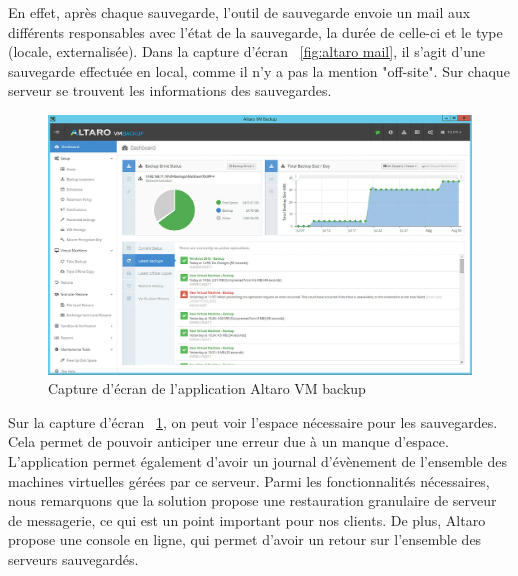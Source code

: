 \documentclass[pfe]{tnreport} %
\begin{document}
En effet, après chaque sauvegarde, l'outil de sauvegarde envoie un mail aux différents responsables avec l'état de la sauvegarde, la durée de celle-ci et le type (locale, externalisée). \newline
Dans la capture d'écran ~\ref{fig:altaro mail}, il s'agit d'une sauvegarde effectuée en local, comme il n'y a pas la mention "off-site". \newline
Sur chaque serveur se trouvent les informations des sauvegardes.
\begin{figure}[ht]
 \centering
 \includegraphics[width=15cm]{figures/Altaro-VM-Backup-dashboard.jpg}
 \caption{Capture d'écran de l'application Altaro VM backup}
 \label{fig:altaro console1}
\end{figure}

Sur la capture d'écran ~\ref{fig:altaro console1}, on peut voir l'espace nécessaire pour les sauvegardes. Cela permet de pouvoir anticiper une erreur due à un manque d'espace. L'application permet également d'avoir un journal d'évènement de l'ensemble des machines virtuelles gérées par ce serveur. \newline
Parmi les fonctionnalités nécessaires, nous remarquons que la solution propose une restauration granulaire de serveur de messagerie, ce qui est un point important pour nos clients. \newline
De plus, Altaro propose une console en ligne, qui permet d'avoir un retour sur l'ensemble des serveurs sauvegardés.
\end{document}
